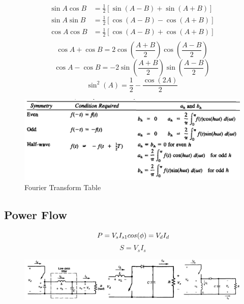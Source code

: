 \documentclass[twocolumn, ]{article}
\begin{document}
\begin{align*}
          \sin A \cos B &= \frac{1}{2}\left[ \sin(A-B)+\sin(A+B) \right] \\
          \sin A \sin B &= \frac{1}{2}\left[ \cos(A-B)-\cos(A+B) \right] \\
          \cos A \cos B &= \frac{1}{2}\left[ \cos(A-B)+\cos(A+B) \right] \\     
\end{align*}  
\begin{equation*}
	  \cos A +\cos B = 2\cos(\frac{A+B}{2})\cos(\frac{A-B}{2})
\end{equation*}
\begin{equation*}
	  \cos A -\cos B = -2\sin(\frac{A+B}{2})\sin(\frac{A-B}{2})
\end{equation*}
\begin{equation*}
	\sin^2(A)=\frac{1}{2}-\frac{\cos(2A)}{2}
\end{equation*}
  \begin{figure}[!ht]
	\includegraphics[scale=0.35]{Fourier.png}
	\caption{Fourier Transform Table}
\end{figure}

\subsection*{\small Power Flow}
\begin{equation*}
	\ P=V_{s}I_{s1}cos(\phi)=V_{d}I_{d}\\	
\end{equation*}
\begin{equation*}
	\ S=V_{s}I_{s}	
\end{equation*}

\begin{figure}[!ht]
	\includegraphics[scale=0.3]{buck_boost.jpg}
\end{figure}
\end{document}
